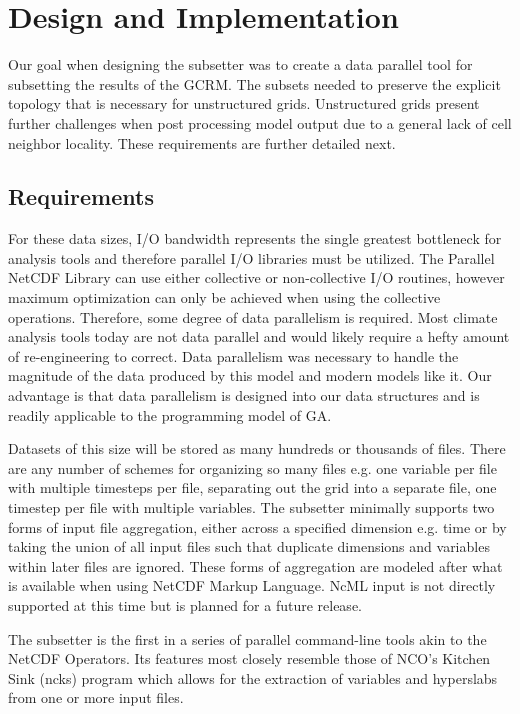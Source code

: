 \section{Design and Implementation}
\label{section:design}

Our goal when designing the subsetter was to create a data parallel tool for
subsetting the results of the GCRM.  The subsets needed to preserve the
explicit topology that is necessary for unstructured grids.  Unstructured
grids present further challenges when post processing model output due to a
general lack of cell neighbor locality.  These requirements are further
detailed next.

\subsection{Requirements}

For these data sizes, I/O bandwidth represents the single greatest bottleneck
for analysis tools and therefore parallel I/O libraries must be utilized.  The
Parallel NetCDF Library\cite{PNETCDF} can use either collective or
non-collective I/O routines, however maximum optimization can only be achieved
when using the collective operations. Therefore, some degree of data
parallelism is required.  Most climate analysis tools today are not data
parallel and would likely require a hefty amount of re-engineering to correct.
Data parallelism was necessary to handle the magnitude of the data produced by
this model and modern models like it.  Our advantage is that data parallelism
is designed into our data structures and is readily applicable to the
programming model of GA.

Datasets of this size will be stored as many hundreds or thousands of files.
There are any number of schemes for organizing so many files e.g. one variable
per file with multiple timesteps per file, separating out the grid into a
separate file, one timestep per file with multiple variables. The subsetter
minimally supports two forms of input file aggregation, either across a
specified dimension e.g. time or by taking the union of all input files such
that duplicate dimensions and variables within later files are ignored.
These forms of aggregation are modeled after what is available when using
NetCDF Markup Language.\cite{NcML} NcML input is not directly supported at
this time but is planned for a future release. 

The subsetter is the first in a series of parallel command-line tools
akin to the NetCDF Operators.\cite{NCO}  Its features most closely resemble
those of NCO's Kitchen Sink (ncks) program which allows for the extraction of
variables and hyperslabs from one or more input files.

